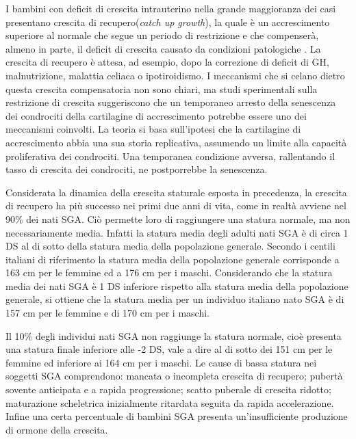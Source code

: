 I bambini con deficit di crescita intrauterino nella grande maggioranza dei casi presentano crescita di recupero(\textit{catch up growth}), la quale è un accrescimento superiore al normale che segue un periodo di restrizione e che compenserà, almeno in parte, il deficit di crescita causato da condizioni patologiche \cite{boersma1997catch}.
La crescita di recupero è attesa, ad esempio, dopo la correzione di deficit di GH, malnutrizione, malattia celiaca o ipotiroidismo. I meccanismi che si celano dietro questa crescita compensatoria non sono chiari, ma studi sperimentali sulla restrizione di crescita suggeriscono che un temporaneo arresto della senescenza dei condrociti della cartilagine di accrescimento potrebbe essere uno dei meccanismi 
coinvolti.
La teoria si basa sull'ipotesi che la cartilagine di accrescimento abbia una sua storia replicativa, assumendo un limite alla capacità proliferativa dei condrociti. Una temporanea condizione avversa, rallentando il tasso di crescita dei condrociti, ne postporrebbe la senescenza.\cite{gafni2001catch} 


Considerata la dinamica della crescita staturale esposta in precedenza, la crescita di recupero ha più successo nei primi due anni di vita, come in realtà avviene nel 90\% dei nati SGA\cite{karlberg1995growth}. Ciò permette loro di raggiungere una statura normale, ma non necessariamente media. Infatti la statura media degli adulti nati SGA è di circa 1 DS al di sotto della statura 
media della popolazione generale\cite{leger1997reduced}. Secondo i centili italiani di riferimento \cite{cacciari2006italian} la statura media della popolazione generale corrisponde a 163 cm per le femmine ed a 176 cm per i maschi. Considerando che la statura media dei nati SGA è 1 DS inferiore rispetto alla statura media della popolazione generale,   
si ottiene che la statura media per un individuo italiano nato SGA è di 157 cm per le femmine e di 170 cm per i maschi. 


Il 10\% degli individui nati SGA non raggiunge la statura normale, cioè presenta una statura finale inferiore alle -2 DS, vale a dire al di sotto dei 151 cm per le femmine ed inferiore ai 164 cm per i maschi. 
Le cause di bassa statura nei soggetti SGA comprendono: mancata o incompleta crescita di recupero; pubertà sovente anticipata e a rapida progressione; scatto puberale di crescita ridotto; maturazione scheletrica inizialmente ritardata seguita da rapida accelerazione. Infine una certa percentuale di bambini SGA presenta un'insufficiente produzione di ormone della crescita\cite{leger1997reduced}.
 

